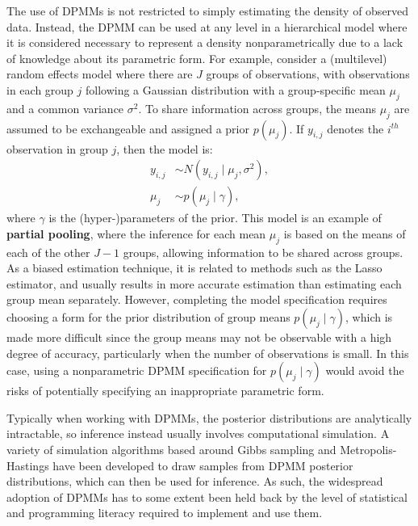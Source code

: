 \documentclass[nojss]{jss}
\begin{document}
The use of DPMMs is not restricted to simply estimating the density of observed data. Instead, the DPMM can be used at any level in a hierarchical model where it is considered necessary to represent a density nonparametrically due to a lack of knowledge about its parametric form. For example, consider a (multilevel) random effects model where there are $J$ groups of observations, with observations in each group $j$ following a Gaussian distribution with a group-specific mean $\mu_j$ and a common variance $\sigma^2$. To share information across groups, the means $\mu_j$ are assumed to be exchangeable and assigned a prior $p(\mu_j)$. If $y_{i,j}$ denotes the $i^{th}$ observation in group $j$, then the model is:
\begin{align*}
y_{i,j} & \sim N(y_{i,j} \mid \mu_j,\sigma^2), \\
\mu_j & \sim p(\mu_j \mid \gamma),
\end{align*}
where $\gamma$ is the (hyper-)parameters of the prior. This model is an example of \textbf{partial pooling}, where the inference for each mean $\mu_j$ is based on the means of each of the other $J-1$ groups, allowing information to be shared across groups. As a biased estimation technique, it is related to methods such as the Lasso estimator, and usually results in more accurate estimation than estimating each group mean separately. However, completing the model specification requires choosing a form for the prior distribution of group means $p(\mu_j \mid \gamma)$, which is made more difficult since the group means may not be observable with a high degree of accuracy, particularly when the number of observations is small. In this case, using a nonparametric DPMM specification for $p(\mu_j \mid \gamma) $ would avoid the risks of potentially specifying an inappropriate parametric form.

Typically when working with DPMMs, the posterior distributions are analytically intractable, so inference instead usually involves computational simulation. A variety of simulation algorithms based around Gibbs sampling and Metropolis-Hastings have been developed to draw samples from DPMM posterior distributions, which can then be used for inference. As such, the widespread adoption of DPMMs has to some extent been held back by the level of statistical and programming literacy required to implement and use them. %
\end{document}
